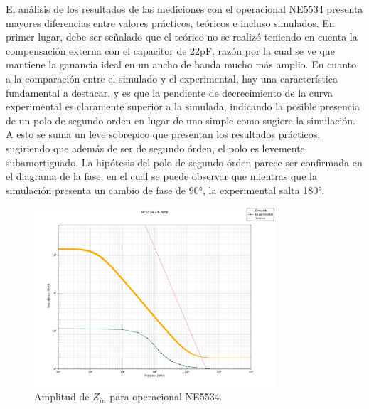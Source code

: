 El análisis de los resultados de las mediciones con el operacional NE5534 presenta mayores diferencias entre valores prácticos, teóricos e incluso simulados.
En primer lugar, debe ser señalado que el teórico no se realizó teniendo en cuenta la compensación externa con el capacitor de 22pF, razón por la cual se ve que mantiene la ganancia ideal en un ancho de banda mucho más amplio.
En cuanto a la comparación entre el simulado y el experimental, hay una característica fundamental a destacar, y es que la pendiente de decrecimiento de la curva experimental es claramente superior a la simulada, indicando la posible presencia de un polo de segundo orden en lugar de uno simple como sugiere la simulación.
A esto se suma un leve sobrepico que presentan los resultados prácticos, sugiriendo que además de ser de segundo órden, el polo es levemente subamortiguado.
La hipótesis del polo de segundo órden parece ser confirmada en el diagrama de la fase, en el cual se puede observar que mientras que la simulación presenta un cambio de fase de 90°, la experimental salta 180°.
\begin{figure}[H]
    \begin{minipage}{\textwidth}
        \centering
        \includegraphics[width=0.8\textwidth]{../EJ2/recursos_para_el_informe/NE5534_Zin_Amp}
        \caption{Amplitud de $Z_{in}$ para operacional NE5534.}
        \label{fig:NE5534_Zin_Amp}
    \end{minipage}\hfill
\end{figure}
